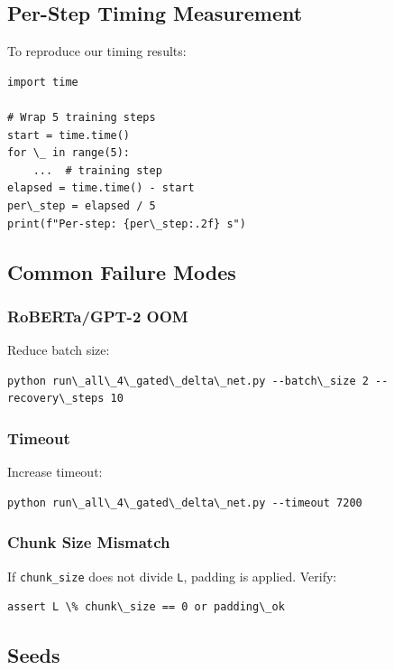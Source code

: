 \subsection{Per-Step Timing Measurement}

To reproduce our timing results:

\begin{lstlisting}
import time

# Wrap 5 training steps
start = time.time()
for \_ in range(5):
    ...  # training step
elapsed = time.time() - start
per\_step = elapsed / 5
print(f"Per-step: {per\_step:.2f} s")
\end{lstlisting}

\subsection{Common Failure Modes}

\subsubsection{RoBERTa/GPT-2 OOM}

Reduce batch size:

\begin{lstlisting}
python run\_all\_4\_gated\_delta\_net.py --batch\_size 2 --recovery\_steps 10
\end{lstlisting}

\subsubsection{Timeout}

Increase timeout:

\begin{lstlisting}
python run\_all\_4\_gated\_delta\_net.py --timeout 7200
\end{lstlisting}

\subsubsection{Chunk Size Mismatch}

If \texttt{chunk\_size} does not divide \texttt{L}, padding is applied. Verify:

\begin{lstlisting}
assert L \% chunk\_size == 0 or padding\_ok
\end{lstlisting}

\subsection{Seeds}

